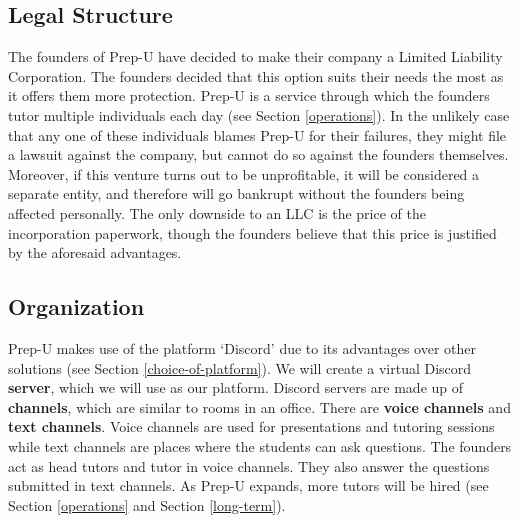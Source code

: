 \documentclass{business}
\begin{document}
    \subsection{Legal Structure}
    The founders of Prep-U have decided to make their company a Limited Liability Corporation. The founders decided that this option suits their needs the most as it offers them more protection. Prep-U is a service through which the founders tutor multiple individuals each day (see Section \ref{operations}). In the unlikely case that any one of these individuals blames Prep-U for their failures, they might file a lawsuit against the company, but cannot do so against the founders themselves. Moreover, if this venture turns out to be unprofitable, it will be considered a separate entity, and therefore will go bankrupt without the founders being affected personally. The only downside to an LLC is the price of the incorporation paperwork, though the founders believe that this price is justified by the aforesaid advantages.
    \subsection{Organization}
    Prep-U makes use of the platform `Discord' due to its advantages over other solutions (see Section \ref{choice-of-platform}). We will create a virtual Discord \textbf{server}, which we will use as our platform. Discord servers are made up of \textbf{channels}, which are similar to rooms in an office. There are \textbf{voice channels} and \textbf{text channels}. Voice channels are used for presentations and tutoring sessions while text channels are places where the students can ask questions. The founders act as head tutors and tutor in voice channels. They also answer the questions submitted in text channels. As Prep-U expands, more tutors will be hired (see Section \ref{operations} and Section \ref{long-term}).
\end{document}
